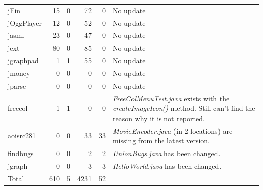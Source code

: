 \documentclass{IEEEtran}
\begin{document}
\begin{table}[H]
\begin{tabular}{l|r|r|r|r|p{6cm}}
	jFin		& 15	& 0		& 72	& 0 & No update \\
	jOggPlayer	& 12 	& 0		& 52	& 0 & No update \\
	jasml		& 23	& 0		& 47	& 0 & No update \\
	jext		& 80	& 0		& 85	& 0 & No update \\
	jgraphpad	& 1		& 1		& 55	& 0 & No update \\
	jmoney		& 0		& 0		& 0		& 0 & No update \\
	jparse		& 0		& 0		& 0		& 0 & No update \\
	\hline
	freecol		& 1		& 1		& 0		& 0		& \textit{FreeColMenuTest.java} exists with the \textit{createImageIcon()} method. Still can't find the reason why it is not reported. \\		
	aoisrc281	& 0		& 0		& 33	& 33 	& \textit{MovieEncoder.java} (in 2 locations) are missing from the latest version. \\
	findbugs	& 0		& 0		& 2		& 2 	& \textit{UnionBugs.java} has been changed. \\
	jgraph		& 0		& 0		& 3		& 3 	& \textit{HelloWorld.java} has been changed. \\
	\hline
	Total		& 610	& 5		& 4231	& 52 	&\\
	\hline
\end{tabular}
\end{table}
\end{document}

